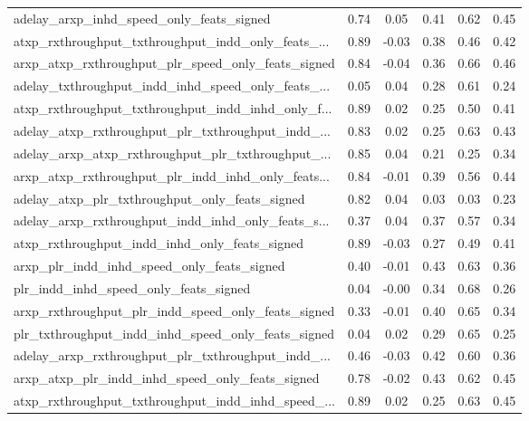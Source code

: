 \begin{tabular}{|l|*{4}{c}|r|}
adelay\_arxp\_inhd\_speed\_only\_feats\_signed           & 0.74 &  0.05 &    0.41 &       0.62 &  0.45 \\
atxp\_rxthroughput\_txthroughput\_indd\_only\_feats\_... & 0.89 & -0.03 &    0.38 &       0.46 &  0.42 \\
arxp\_atxp\_rxthroughput\_plr\_speed\_only\_feats\_signed & 0.84 & -0.04 &    0.36 &       0.66 &  0.46 \\
adelay\_txthroughput\_indd\_inhd\_speed\_only\_feats\_... & 0.05 &  0.04 &    0.28 &       0.61 &  0.24 \\
atxp\_rxthroughput\_txthroughput\_indd\_inhd\_only\_f... & 0.89 &  0.02 &    0.25 &       0.50 &  0.41 \\
adelay\_atxp\_rxthroughput\_plr\_txthroughput\_indd\_... & 0.83 &  0.02 &    0.25 &       0.63 &  0.43 \\
adelay\_arxp\_atxp\_rxthroughput\_plr\_txthroughput\_... & 0.85 &  0.04 &    0.21 &       0.25 &  0.34 \\
arxp\_atxp\_rxthroughput\_plr\_indd\_inhd\_only\_feats... & 0.84 & -0.01 &    0.39 &       0.56 &  0.44 \\
adelay\_atxp\_plr\_txthroughput\_only\_feats\_signed     & 0.82 &  0.04 &    0.03 &       0.03 &  0.23 \\
adelay\_arxp\_rxthroughput\_indd\_inhd\_only\_feats\_s... & 0.37 &  0.04 &    0.37 &       0.57 &  0.34 \\
atxp\_rxthroughput\_indd\_inhd\_only\_feats\_signed      & 0.89 & -0.03 &    0.27 &       0.49 &  0.41 \\
arxp\_plr\_indd\_inhd\_speed\_only\_feats\_signed         & 0.40 & -0.01 &    0.43 &       0.63 &  0.36 \\
plr\_indd\_inhd\_speed\_only\_feats\_signed              & 0.04 & -0.00 &    0.34 &       0.68 &  0.26 \\
arxp\_rxthroughput\_plr\_indd\_speed\_only\_feats\_signed & 0.33 & -0.01 &    0.40 &       0.65 &  0.34 \\
plr\_txthroughput\_indd\_inhd\_speed\_only\_feats\_signed & 0.04 &  0.02 &    0.29 &       0.65 &  0.25 \\
adelay\_arxp\_rxthroughput\_plr\_txthroughput\_indd\_... & 0.46 & -0.03 &    0.42 &       0.60 &  0.36 \\
arxp\_atxp\_plr\_indd\_inhd\_speed\_only\_feats\_signed    & 0.78 & -0.02 &    0.43 &       0.62 &  0.45 \\
atxp\_rxthroughput\_txthroughput\_indd\_inhd\_speed\_... & 0.89 &  0.02 &    0.25 &       0.63 &  0.45 \\

\end{tabular}
